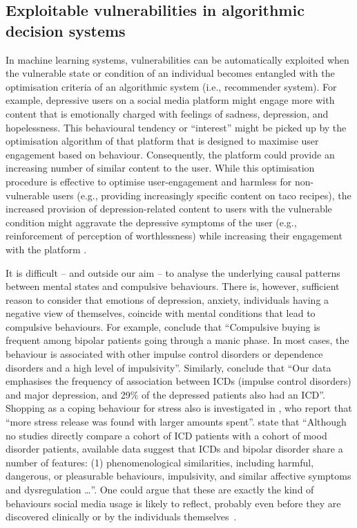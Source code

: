 \documentclass[11pt,theapa]{article}
\theoremstyle{plain}
\begin{document}
\subsection{Exploitable vulnerabilities in algorithmic decision systems}
In machine learning systems, vulnerabilities can be automatically exploited when the vulnerable state or condition of an individual becomes entangled with the optimisation criteria of an algorithmic system (i.e., recommender system). For example, depressive users on a social media platform might engage more with content that is emotionally charged with feelings of sadness, depression, and hopelessness. This behavioural tendency or ``interest'' might be picked up by the optimisation algorithm of that platform that is designed to maximise user engagement based on behaviour. Consequently, the platform could provide an increasing number of similar content to the user. While this optimisation procedure is effective to optimise user-engagement and harmless for non-vulnerable users (e.g., providing increasingly specific content on taco recipes), the increased provision of depression-related content to users with the vulnerable condition might aggravate the depressive symptoms of the user (e.g., reinforcement of perception of worthlessness) while increasing their engagement with the platform \cite{TikTokWSJ}. 

It is difficult -- and outside our aim -- to analyse the underlying causal patterns between mental states and compulsive behaviours. There is, however, sufficient reason to consider that emotions of depression, anxiety,  individuals having a negative view of themselves, coincide with mental conditions that lead to compulsive behaviours. 
For example, \cite{lejoyeux1997study} conclude that ``Compulsive buying is frequent among bipolar patients going through a manic phase. In most cases, the behaviour is associated with other impulse control disorders or dependence disorders and a high level of impulsivity''. Similarly, \cite{lejoyeux2002impulse} conclude that ``Our data emphasises the frequency of association between ICDs (impulse control disorders) and major depression, and 29\% of the depressed patients also had an ICD''. Shopping as a coping behaviour for stress also is investigated in \cite{yasuhisa2001}, who report that ``more stress release was found with larger amounts spent''.
\cite{mcelroy1996impulse} state that ``Although no studies directly compare a cohort of ICD patients with a cohort of mood disorder patients, available data suggest that ICDs and bipolar disorder share a number of features: (1) phenomenological similarities, including harmful, dangerous, or pleasurable behaviours, impulsivity, and similar affective symptoms and dysregulation \dots''. One could argue that these are exactly the kind of behaviours social media usage is likely to reflect, probably even before they are discovered clinically or by the individuals themselves~\cite{facebook_depression2018}.
\end{document}
